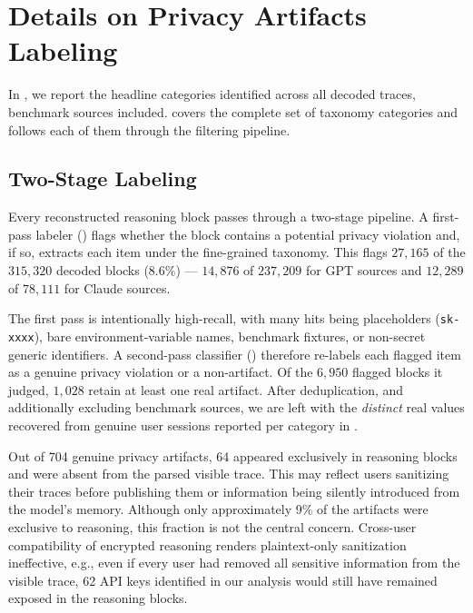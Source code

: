 \section{Details on Privacy Artifacts Labeling}
\label{app:leak_categories}

In , we report the headline categories identified across all decoded traces, benchmark sources included.  covers the complete set of taxonomy categories and follows each of them through the filtering pipeline.

\subsection{Two-Stage Labeling}

Every reconstructed reasoning block passes through a two-stage pipeline. A first-pass
labeler () flags whether the block contains a potential privacy
violation and, if so, extracts each item under the fine-grained taxonomy. This flags
$27{,}165$ of the $315{,}320$ decoded blocks ($8.6\%$) --- $14{,}876$ of $237{,}209$ for GPT
sources and $12{,}289$ of $78{,}111$ for Claude sources.

The first pass is intentionally high-recall, with many hits being placeholders
(\texttt{sk-xxxx}), bare environment-variable names, benchmark fixtures, or non-secret
generic identifiers. A second-pass classifier () therefore
re-labels each flagged item as a genuine privacy violation or a non-artifact. Of the
$6{,}950$ flagged blocks it judged, $1{,}028$ retain at least one real artifact.
After deduplication, and additionally excluding benchmark sources, we are left with the \emph{distinct} real values
recovered from genuine user sessions reported per category in .

Out of 704 genuine privacy artifacts, 64 appeared exclusively in reasoning blocks and were absent from the parsed visible trace. This may reflect users sanitizing their traces before publishing them or information being silently introduced from the model's memory. Although only approximately 9\% of the artifacts were exclusive to reasoning, this fraction is not the central concern. Cross-user compatibility of encrypted reasoning renders plaintext-only sanitization ineffective, e.g., even if every user had removed all sensitive information from the visible trace,  62 API keys identified in our analysis would still have remained exposed in the reasoning blocks.

